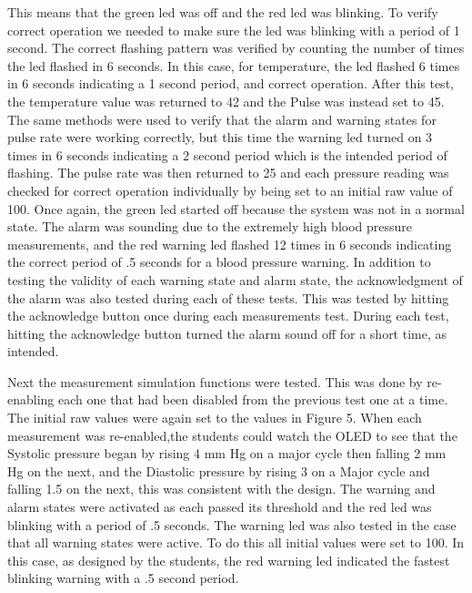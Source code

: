 \documentclass[12pt]{article} %
\begin{document}
    This means that the green led was off and the red led was blinking. To
    verify correct operation we needed to make sure the led was blinking with a
    period of 1 second. The correct flashing pattern was verified by counting
    the number of times the led flashed in 6 seconds.  In this case, for
    temperature, the led flashed 6 times in 6 seconds indicating a 1 second
    period, and correct operation. After this test, the temperature value was
    returned to 42 and the Pulse was instead set to 45.  The same methods were
    used to verify that the alarm and warning states for pulse rate were
    working correctly, but this time the warning led turned on 3 times in 6
    seconds indicating a 2 second period which is the intended period of
    flashing. The pulse rate was then returned to 25 and each pressure reading
    was checked for correct operation individually by being set to an initial
    raw value of 100. Once again, the green led started off because the system
    was not in a normal state. The alarm was sounding due to the extremely high
    blood pressure measurements, and the red warning led flashed 12 times in 6
    seconds indicating the correct period of .5 seconds for a blood pressure
    warning. In addition to testing the validity of each warning state and
    alarm state, the acknowledgment of the alarm was also tested during each
    of these tests. This was tested by hitting the acknowledge button once
    during each measurements test. During each test, hitting the acknowledge
    button turned the alarm sound off for a short time, as intended. 


    Next the measurement simulation functions were tested. This was done by
    re-enabling each one that had been disabled from the previous test one at a
    time. The initial raw values were again set to the values in Figure 5. When
    each measurement was re-enabled,the students could watch the OLED to see that the Systolic pressure
    began by rising 4 mm Hg on a major cycle then falling 2 mm Hg on the next,
    and the Diastolic pressure by rising 3 on a Major cycle and falling 1.5 on
    the next, this was consistent with the design. The warning and alarm states
    were activated as each passed its threshold and the red led was blinking
    with a period of .5 seconds.  The warning led was also tested in the case
    that all warning states were active. To do this all initial values were set
    to 100. In this case, as designed by the students, the red warning led
    indicated the fastest blinking warning with a .5 second period. 
    
\end{document}
